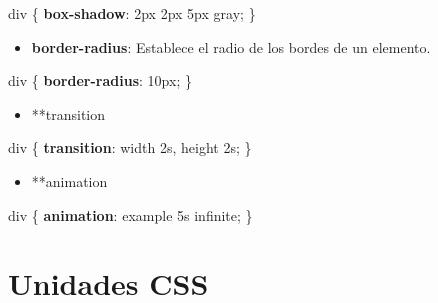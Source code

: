 \documentclass[
  a4paper,
  DIV=11,
  numbers=noendperiod,
  onepage,
  openany]{scrreprt}
\newenvironment{Shaded}{\begin{snugshade}}{\end{snugshade}}
\newcommand{\CharTok}[1]{\textcolor[rgb]{0.13,0.47,0.30}{#1}}
\newcommand{\ConstantTok}[1]{\textcolor[rgb]{0.56,0.35,0.01}{#1}}
\newcommand{\DataTypeTok}[1]{\textcolor[rgb]{0.68,0.00,0.00}{#1}}
\newcommand{\DecValTok}[1]{\textcolor[rgb]{0.68,0.00,0.00}{#1}}
\newcommand{\KeywordTok}[1]{\textcolor[rgb]{0.00,0.23,0.31}{\textbf{#1}}}
\newcommand{\NormalTok}[1]{\textcolor[rgb]{0.00,0.23,0.31}{#1}}
\newcommand{\OperatorTok}[1]{\textcolor[rgb]{0.37,0.37,0.37}{#1}}
\providecommand{\tightlist}{%
  \setlength{\itemsep}{0pt}\setlength{\parskip}{0pt}}\usepackage{longtable,booktabs,array}
\begin{document}
\begin{tcolorbox}
\begin{Shaded}
\begin{Highlighting}[]
\NormalTok{div \{}
  \KeywordTok{box{-}shadow}\CharTok{:} \DecValTok{2}\DataTypeTok{px} \DecValTok{2}\DataTypeTok{px} \DecValTok{5}\DataTypeTok{px} \ConstantTok{gray}\OperatorTok{;}
\NormalTok{\}}
\end{Highlighting}
\end{Shaded}

\begin{itemize}
\tightlist
\item
  \textbf{border-radius}: Establece el radio de los bordes de un
  elemento.
\end{itemize}

\begin{Shaded}
\begin{Highlighting}[]
\NormalTok{div \{}
  \KeywordTok{border{-}radius}\CharTok{:} \DecValTok{10}\DataTypeTok{px}\OperatorTok{;}
\NormalTok{\}}
\end{Highlighting}
\end{Shaded}

\begin{itemize}
\tightlist
\item
  **transition
\end{itemize}

\begin{Shaded}
\begin{Highlighting}[]
\NormalTok{div \{}
  \KeywordTok{transition}\CharTok{:} \DecValTok{width 2}\DataTypeTok{s}\OperatorTok{,} \DecValTok{height 2}\DataTypeTok{s}\OperatorTok{;}
\NormalTok{\}}
\end{Highlighting}
\end{Shaded}

\begin{itemize}
\tightlist
\item
  **animation
\end{itemize}

\begin{Shaded}
\begin{Highlighting}[]
\NormalTok{div \{}
  \KeywordTok{animation}\CharTok{:} \DecValTok{example 5}\DataTypeTok{s} \DecValTok{infinite}\OperatorTok{;}
\NormalTok{\}}
\end{Highlighting}
\end{Shaded}

\section{Unidades CSS}\label{unidades-css}


\end{tcolorbox}
\end{document}
